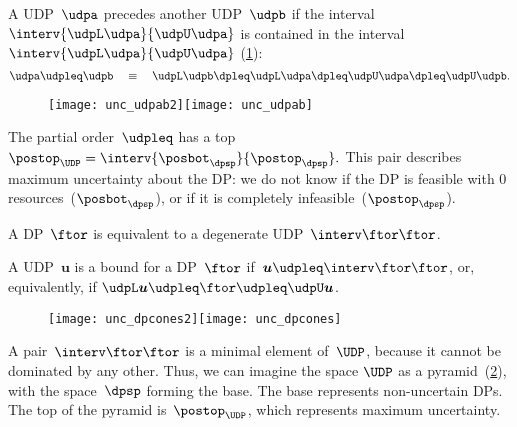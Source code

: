 \begin{definition}
    \label{def:udpleq}
    A UDP~$\udpa$ precedes another UDP~$\udpb$ if the interval~$\interv{\udpL\udpa}{\udpU\udpa}$
    is contained in the interval~$\interv{\udpL\udpa}{\udpU\udpa}$ (\cref{fig:udpspace}):
    \begin{equation}
        \udpa\udpleq\udpb\quad\equiv\quad\udpL\udpb\dpleq\udpL\udpa\dpleq\udpU\udpa\dpleq\udpU\udpb.
    \end{equation}
\end{definition}

\begin{figure}[h!]
    \texttt{[image: unc\_udpab2]}\texttt{[image: unc\_udpab]}
    \caption{}
    \label{fig:udpspace}
\end{figure}

The partial order~$\udpleq$ has a top~$\postop_{\UDP}=\interv {\posbot_{\dpsp}} {\postop_{\dpsp}}.
$
This pair describes maximum uncertainty about the DP: we do not know
if the DP is feasible with 0 resources~($\posbot_{\dpsp}$), or if it
is completely infeasible~($\postop_{\dpsp}$).

A DP~$\ftor$ is equivalent to a degenerate UDP~$\interv\ftor\ftor$.

A UDP~$\boldsymbol{u}$ is a bound for a DP~$\ftor$ if~$\boldsymbol{u}\udpleq\interv\ftor\ftor$,
or, equivalently, if $\udpL\boldsymbol{u}\udpleq\ftor\udpleq\udpU\boldsymbol{u}$.

\begin{figure}[h!]
    \texttt{[image: unc\_dpcones2]}\texttt{[image: unc\_dpcones]}
    \caption{}
    \label{fig:pyr1}
\end{figure}

A pair~$\interv\ftor\ftor$ is a minimal element of~$\UDP$, because it cannot be dominated by any other.
Thus, we can imagine the space $\UDP$ as a pyramid~(\cref{fig:pyr1}), with the space~$\dpsp$ forming the base.
The base represents non-uncertain DPs.
The top of the pyramid is~$\postop_{\UDP}$, which represents maximum uncertainty.

%
%

